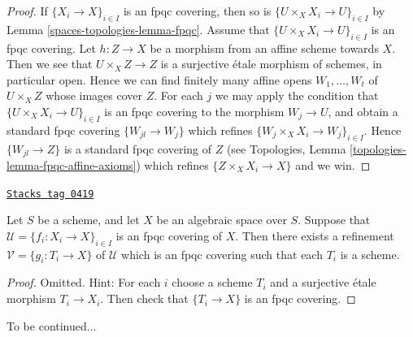 \begin{proof}
If $\{X_i \to X\}_{i \in I}$ is an fpqc covering, then so is
$\{U \times_X X_i \to U\}_{i \in I}$ by Lemma \ref{spaces-topologies-lemma-fpqc}.
Assume that $\{U \times_X X_i \to U\}_{i \in I}$ is an fpqc covering.
Let $h : Z \to X$ be a morphism from an affine scheme towards $X$.
Then we see that $U \times_X Z \to Z$ is a surjective \'etale morphism
of schemes, in particular open. Hence we can find finitely many affine opens
$W_1, \ldots, W_t$ of $U \times_X Z$ whose images cover $Z$.
For each $j$ we may apply the condition that
$\{U \times_X X_i \to U\}_{i \in I}$ is an fpqc covering
to the morphism $W_j \to U$, and obtain a standard fpqc covering
$\{W_{jl} \to W_j\}$ which refines $\{W_j \times_X X_i \to W_j\}_{i \in I}$.
Hence $\{W_{jl} \to Z\}$ is a standard fpqc covering of $Z$
(see
Topologies, Lemma \ref{topologies-lemma-fpqc-affine-axioms})
which refines $\{Z \times_X X_i \to X\}$ and we win.
\end{proof}

\begin{lemma}
\label{spaces-topologies-lemma-refine-fpqc-schemes}
\href{https://stacks.math.columbia.edu/tag/0419}{\texttt{Stacks tag 0419}}

Let $S$ be a scheme, and let $X$ be an algebraic space over $S$.
Suppose that $\mathcal{U} = \{f_i : X_i \to X\}_{i \in I}$ is an
fpqc covering of $X$. Then there exists a refinement
$\mathcal{V} = \{g_i : T_i \to X\}$ of $\mathcal{U}$ which is an
fpqc covering such that each $T_i$ is a scheme.
\end{lemma}

\begin{proof}
Omitted. Hint: For each $i$ choose a scheme $T_i$ and a surjective \'etale
morphism $T_i \to X_i$. Then check that $\{T_i \to X\}$ is an fpqc covering.
\end{proof}

To be continued...



